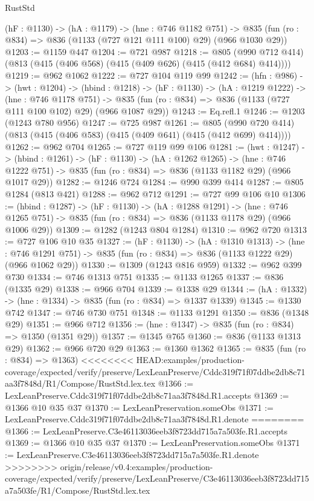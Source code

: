\begin{lexlean}{RustStd}
\begin{coremodule}
{\begin{coremodule}
  (hF : @1130) ->
  (hA : @1179) ->
  (hne : @746 @1182 @751) ->
  @835 (fun (ro : @834) => @836 (@1133 (@727 @121 @111 @100) @29) (@966 @1030 @29))
@1203 := @1159 @447
@1204 := @721 @987
@1218 := @805 (@990 @712 @414) (@813 (@415 (@406 @568) (@415 (@409 @626) (@415 (@412 @684) @414))))
@1219 := @962 @1062
@1222 := @727 @104 @119 @99
@1242 := (hfn : @986) ->
  (hwt : @1204) ->
  (hbind : @1218) ->
  (hF : @1130) ->
  (hA : @1219 @1222) ->
  (hne : @746 @1178 @751) ->
  @835 (fun (ro : @834) => @836 (@1133 (@727 @111 @100 @102) @29) (@966 @1087 @29))
@1243 := Eq.refl.{1}
@1246 := @1203 (@1243 @780 @956)
@1247 := @725 @987
@1261 := @805 (@990 @720 @414) (@813 (@415 (@406 @583) (@415 (@409 @641) (@415 (@412 @699) @414))))
@1262 := @962 @704
@1265 := @727 @119 @99 @106
@1281 := (hwt : @1247) ->
  (hbind : @1261) ->
  (hF : @1130) ->
  (hA : @1262 @1265) ->
  (hne : @746 @1222 @751) -> @835 (fun (ro : @834) => @836 (@1133 @1182 @29) (@966 @1017 @29))
@1282 := @1246 @724
@1284 := @990 @399 @414
@1287 := @805 @1284 (@813 @421)
@1288 := @962 @712
@1291 := @727 @99 @106 @10
@1306 := (hbind : @1287) ->
  (hF : @1130) ->
  (hA : @1288 @1291) ->
  (hne : @746 @1265 @751) -> @835 (fun (ro : @834) => @836 (@1133 @1178 @29) (@966 @1006 @29))
@1309 := @1282 (@1243 @804 @1284)
@1310 := @962 @720
@1313 := @727 @106 @10 @35
@1327 := (hF : @1130) ->
  (hA : @1310 @1313) ->
  (hne : @746 @1291 @751) -> @835 (fun (ro : @834) => @836 (@1133 @1222 @29) (@966 @1062 @29))
@1330 := @1309 (@1243 @816 @959)
@1332 := @962 @399 @730
@1334 := @746 @1313 @751
@1335 := @1133 @1265
@1337 := @836 (@1335 @29)
@1338 := @966 @704
@1339 := @1338 @29
@1344 := (hA : @1332) -> (hne : @1334) -> @835 (fun (ro : @834) => @1337 @1339)
@1345 := @1330 @742
@1347 := @746 @730 @751
@1348 := @1133 @1291
@1350 := @836 (@1348 @29)
@1351 := @966 @712
@1356 := (hne : @1347) -> @835 (fun (ro : @834) => @1350 (@1351 @29))
@1357 := @1345 @765
@1360 := @836 (@1133 @1313 @29)
@1362 := @966 @720 @29
@1363 := @1360 @1362
@1365 := @835 (fun (ro : @834) => @1363)
<<<<<<<< HEAD:examples/production-coverage/expected/verify/preserve/LexLeanPreserve/Cddc319f71f07ddbe2db8c71aa3f7848d/R1/Compose/RustStd.lex.tex
@1366 := LexLeanPreserve.Cddc319f71f07ddbe2db8c71aa3f7848d.R1.accepts
@1369 := @1366 @10 @35 @37
@1370 := LexLeanPreservation.someObs
@1371 := LexLeanPreserve.Cddc319f71f07ddbe2db8c71aa3f7848d.R1.denote
========
@1366 := LexLeanPreserve.C3e46113036eeb3f8723dd715a7a503fe.R1.accepts
@1369 := @1366 @10 @35 @37
@1370 := LexLeanPreservation.someObs
@1371 := LexLeanPreserve.C3e46113036eeb3f8723dd715a7a503fe.R1.denote
>>>>>>>> origin/release/v0.4:examples/production-coverage/expected/verify/preserve/LexLeanPreserve/C3e46113036eeb3f8723dd715a7a503fe/R1/Compose/RustStd.lex.tex

\end{coremodule}}
\end{coremodule}
\end{lexlean}
